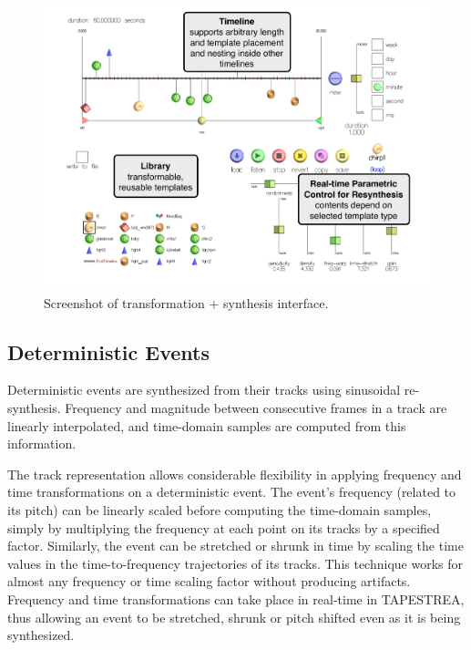 \documentclass[10pt,letterpaper]{article}
\begin{document}
\begin{figure}[h]
  \begin{center}
    \includegraphics[width=.95\columnwidth]{ui_synthesis.pdf}
    \caption{Screenshot of transformation + synthesis interface.} 
    \label{fig:ui_synthesis}
  \end{center}
\end{figure}

\subsection{Deterministic Events} 

Deterministic events are synthesized from their tracks using sinusoidal
re-synthesis. Frequency and magnitude between consecutive frames in a
track are linearly interpolated, and time-domain samples are computed
from this information. 

The track representation allows considerable flexibility in applying
frequency and time transformations on a deterministic event. The event's
frequency (related to its pitch) can be linearly scaled before computing
the time-domain samples, simply by multiplying the frequency at each
point on its tracks by a specified factor. Similarly, the event can be
stretched or shrunk in time by scaling the time values in the
time-to-frequency trajectories of its tracks. This technique works for
almost any frequency or time scaling factor without producing artifacts.
Frequency and time transformations can take place in real-time in
TAPESTREA, thus allowing an event to be stretched, shrunk or pitch
shifted even as it is being synthesized.
\end{document}
